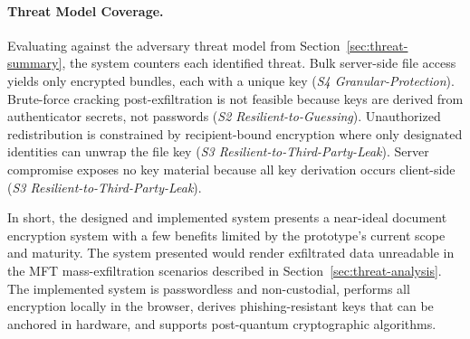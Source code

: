 \paragraph{Threat Model Coverage.} Evaluating against the adversary threat model from Section~\ref{sec:threat-summary}, the system counters each identified threat. Bulk server-side file access yields only encrypted bundles, each with a unique key (\emph{S4 Granular-Protection}). Brute-force cracking post-exfiltration is not feasible because keys are derived from authenticator secrets, not passwords (\emph{S2 Resilient-to-Guessing}). Unauthorized redistribution is constrained by recipient-bound encryption where only designated identities can unwrap the file key (\emph{S3 Resilient-to-Third-Party-Leak}). Server compromise exposes no key material because all key derivation occurs client-side (\emph{S3 Resilient-to-Third-Party-Leak}).

In short, the designed and implemented system presents a near-ideal document encryption system with a few benefits limited by the prototype's current scope and maturity. The system presented would render exfiltrated data unreadable in the MFT mass-exfiltration scenarios described in Section~\ref{sec:threat-analysis}. The implemented system is passwordless and non-custodial, performs all encryption locally in the browser, derives phishing-resistant keys that can be anchored in hardware, and supports post-quantum cryptographic algorithms.

